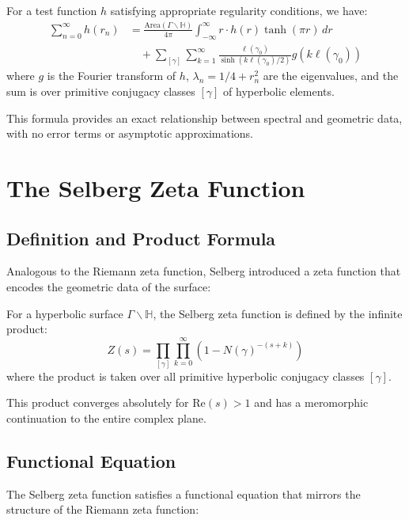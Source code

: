 \begin{theorem}
\label{thm:selberg_trace}
For a test function $h$ satisfying appropriate regularity conditions, we have:
\begin{align}
\sum_{n=0}^{\infty} h(r_n) &= \frac{\text{Area}(\Gamma \backslash \mathbb{H})}{4\pi} \int_{-\infty}^{\infty} r \cdot h(r) \tanh(\pi r) \, dr \\
&\quad + \sum_{[\gamma]} \sum_{k=1}^{\infty} \frac{\ell(\gamma_0)}{\sinh(k\ell(\gamma_0)/2)} g(k\ell(\gamma_0))
\end{align}
where $g$ is the Fourier transform of $h$, $\lambda_n = 1/4 + r_n^2$ are the eigenvalues, and the sum is over primitive conjugacy classes $[\gamma]$ of hyperbolic elements.
\end{theorem}

This formula provides an exact relationship between spectral and geometric data, with no error terms or asymptotic approximations.

\section{The Selberg Zeta Function}
\label{sec:selberg_zeta}

\subsection{Definition and Product Formula}

Analogous to the Riemann zeta function, Selberg introduced a zeta function that encodes the geometric data of the surface:

\begin{definition}
\label{def:selberg_zeta}
For a hyperbolic surface $\Gamma \backslash \mathbb{H}$, the Selberg zeta function is defined by the infinite product:
$$Z(s) = \prod_{[\gamma]} \prod_{k=0}^{\infty} \left(1 - N(\gamma)^{-(s+k)}\right)$$
where the product is taken over all primitive hyperbolic conjugacy classes $[\gamma]$.
\end{definition}

This product converges absolutely for $\text{Re}(s) > 1$ and has a meromorphic continuation to the entire complex plane.

\subsection{Functional Equation}

The Selberg zeta function satisfies a functional equation that mirrors the structure of the Riemann zeta function:

